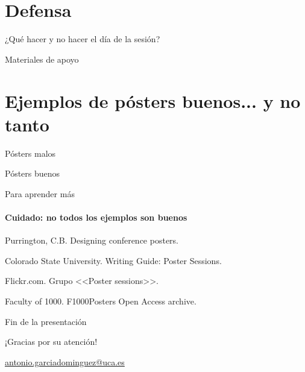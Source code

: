 \documentclass[xcolor=svgnames,compress]{beamer}
\begin{document}
\section{Defensa}

\begin{frame}{¿Qué hacer y no hacer el día de la sesión?}

\end{frame}

\begin{frame}{Materiales de apoyo}


\end{frame}

\section[Ejemplos]{Ejemplos de pósters buenos... y no tanto}
\label{sec:posters}

\begin{frame}{Pósters malos}

\end{frame}

\begin{frame}{Pósters buenos}

\end{frame}

\appendix

\begin{frame}{Para aprender más}
  \framesubtitle{Cuidado: no todos los ejemplos son buenos}

  \begin{thebibliography}{10}
    \beamertemplatearticlebibitems
     Purrington, C.B.
      \newblock Designing conference posters.

     Colorado State University.
      \newblock Writing Guide: Poster Sessions.

     Flickr.com.
      \newblock Grupo <<Poster sessions>>.

     Faculty of 1000.
      \newblock F1000Posters Open Access archive.
  \end{thebibliography}
\end{frame}

\begin{frame}{Fin de la presentación}
  \begin{center}
    {\Huge ¡Gracias por su atención!}

    \vspace{3em}

    {\Large
      \href{mailto:antonio.garciadominguez@uca.es}{antonio.garciadominguez@uca.es}}
  \end{center}
\end{frame}
\end{document}
